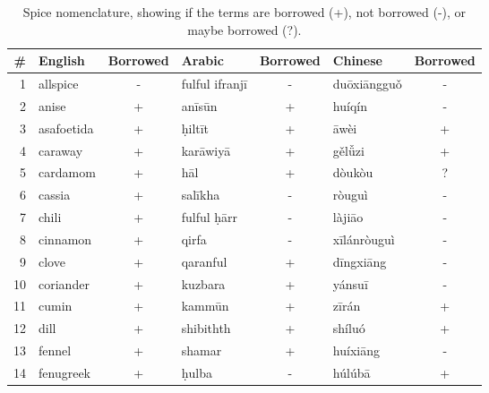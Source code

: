 
\begin{table}[ht]
\caption[Spice nomenclature, showing if the terms are borrowed or not.]{Spice nomenclature, showing if the terms are borrowed (+), not borrowed (-), or maybe borrowed (?).}
\begin{tabular}{@{}rlclclc@{}}
\toprule
\textbf{\#} & \textbf{English} & \textbf{Borrowed} & \textbf{Arabic}  & \textbf{Borrowed} & \textbf{Chinese} & \textbf{Borrowed} \\ \midrule
1           & allspice         & -           & fulful ifranjī   & -           & duōxiāngguǒ      & -           \\
2           & anise            & +           & anīsūn           & +           & huíqín           & -           \\
3           & asafoetida       & +           & ḥiltīt           & +           & āwèi             & +           \\
4           & caraway          & +           & karāwiyā         & +           & gělǚzi           & +           \\
5           & cardamom         & +           & hāl              & +           & dòukòu           & ?           \\
6           & cassia           & +           & salīkha          & -           & ròuguì           & -           \\
7           & chili            & +           & fulful ḥārr      & -           & làjiāo           & -           \\
8           & cinnamon         & +           & qirfa            & -           & xīlánròuguì      & -           \\
9           & clove            & +           & qaranful         & +           & dīngxiāng        & -           \\
10          & coriander        & +           & kuzbara          & +           & yánsuī           & -           \\
11          & cumin            & +           & kammūn           & +           & zīrán            & +           \\
12          & dill             & +           & shibithth        & +           & shíluó           & +           \\
13          & fennel           & +           & shamar           & +           & huíxiāng         & -           \\
14          & fenugreek        & +           & ḥulba            & -           & húlúbā           & +           \\

\end{tabular}
\end{table}
